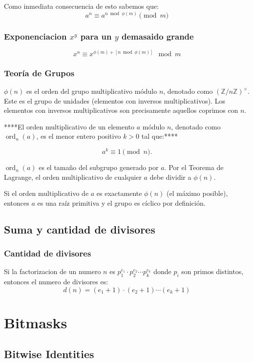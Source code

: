 \documentclass[12pt]{article}
\begin{document}
Como inmediata consecuencia de esto sabemos que:
\[a^n \equiv a^{n \bmod \phi(m)} \pmod m\]
\subsubsection{Exponenciacion \(x^y\) para un \(y\) demasaido grande}
\[x^{n}\equiv x^{\phi(m)+[n \bmod \phi(m)]} \mod m\]
\subsubsection{Teoría de Grupos}

\(\phi(n)\) es el orden del grupo multiplicativo módulo \(n\), denotado como \((\mathbb{Z} / n\mathbb{Z})^\times\). Este es el grupo de unidades (elementos con inversos multiplicativos). Los elementos con inversos multiplicativos son precisamente aquellos coprimos con \(n\).

****El orden multiplicativo de un elemento \(a\) módulo \(n\), denotado como \(\operatorname{ord}_n(a)\), es el menor entero positivo \(k > 0\) tal que:****

\[
a^k \equiv 1 \pmod{n}.
\]

\(\operatorname{ord}_n(a)\) es el tamaño del subgrupo generado por \(a\). Por el Teorema de Lagrange, el orden multiplicativo de cualquier \(a\) debe dividir a \(\phi(n)\).

Si el orden multiplicativo de \(a\) es exactamente \(\phi(n)\) (el máximo posible), entonces \(a\) es una raíz primitiva y el grupo es cíclico por definición.

\subsection{Suma y cantidad de divisores}
\subsubsection{Cantidad de divisores}
    Si la factorizacion de un numero \(n\) es \(p_1^{e_1} \cdot p_2^{e_2} \cdots p_k^{e_k}\) donde \(p_i\) son primos distintos, entonces el numero de divisores es:
        \[d(n) = (e_1 + 1) \cdot (e_2 + 1) \cdots (e_k + 1)\]
\section{Bitmasks}
    \subsection{Bitwise Identities}
\end{document}
